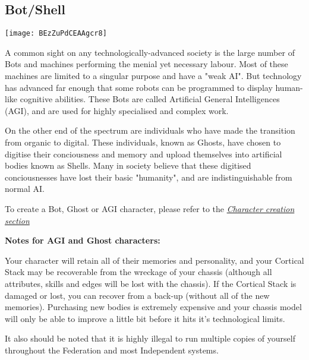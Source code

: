 \subsection{Bot/Shell}
\label{sec:specie-bots}

\texttt{[image: BEzZuPdCEAAgcr8]}

A common sight on any technologically-advanced society is the large number of Bots and machines performing the menial yet necessary labour. Most of these machines are limited to a singular purpose and have a "weak AI". But technology has advanced far enough that some robots can be programmed to display human-like cognitive abilities. These Bots are called Artificial General Intelligences (AGI), and are used for highly specialised and complex work.

On the other end of the spectrum are individuals who have made the transition from organic to digital. These individuals, known as Ghosts, have chosen to digitise their conciousness and memory and upload themselves into artificial bodies known as Shells. Many in society believe that these digitised conciousnesses have lost their basic "humanity", and are indistinguishable from normal AI.

To create a Bot, Ghost or AGI character, please refer to the \textit{\hyperref[sec:rules-creation]{Character creation section}}

\textbf{Notes for AGI and Ghost characters:}

Your character will retain all of their memories and personality, and your Cortical Stack may be recoverable from the wreckage of your chassis (although all attributes, skills and edges will be lost with the chassis). If the Cortical Stack is damaged or lost, you can recover from a back-up (without all of the new memories). Purchasing new bodies is extremely expensive and your chassis model will only be able to improve a little bit before it hits it's technological limits.

It also should be noted that it is highly illegal to run multiple copies of yourself throughout the Federation and most Independent systems.

